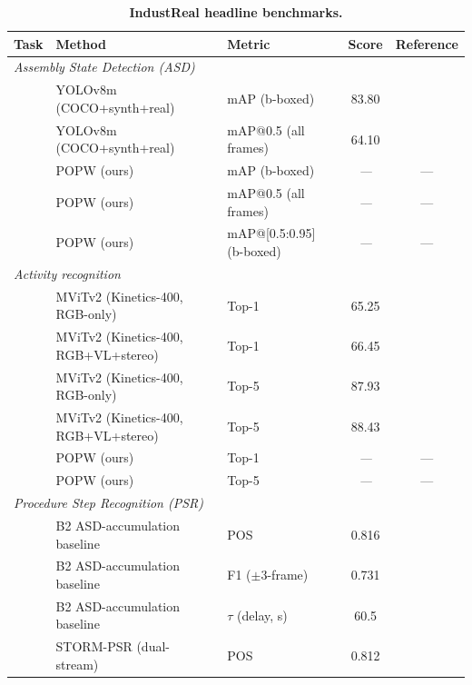 \documentclass[11pt,a4paper]{article}
\newcommand{\popw}{POPW}
\newcommand{\industreal}{IndustReal}
\newcommand{\map}{mAP}
\newcommand{\todo}{\textit{---}}
\newcommand{\popwres}{\todo}
\begin{document}
\begin{table}[!htbp]
\centering
\small
\caption{\textbf{\industreal{} headline benchmarks.}}
\label{tab:industreal-headline}
\begin{tabular}{l l l c c}
\toprule
\textbf{Task} & \textbf{Method} & \textbf{Metric} & \textbf{Score} & \textbf{Reference} \\
\midrule
\multicolumn{5}{l}{\textit{Assembly State Detection (ASD)}} \\
  & YOLOv8m (COCO+synth+real) & \map{} (b-boxed) & 83.80 & \cite{schoonbeek2024industreal} \\
  & YOLOv8m (COCO+synth+real) & \map{}@0.5 (all frames) & 64.10 & \cite{schoonbeek2024industreal} \\
  & \popw{} (ours)            & \map{} (b-boxed) & \popwres & --- \\
  & \popw{} (ours)            & \map{}@0.5 (all frames) & \popwres & --- \\
  & \popw{} (ours)            & \map{}@[0.5{:}0.95] (b-boxed) & \popwres & --- \\
\midrule
\multicolumn{5}{l}{\textit{Activity recognition}} \\
& MViTv2 (Kinetics-400, RGB-only) & Top-1   & 65.25 & \cite{schoonbeek2024industreal} \\
  & MViTv2 (Kinetics-400, RGB+VL+stereo) & Top-1   & 66.45 & \cite{schoonbeek2024industreal} \\
  & MViTv2 (Kinetics-400, RGB-only) & Top-5   & 87.93 & \cite{schoonbeek2024industreal} \\
  & MViTv2 (Kinetics-400, RGB+VL+stereo) & Top-5   & 88.43 & \cite{schoonbeek2024industreal} \\
 & \popw{} (ours)            & Top-1          & \popwres & --- \\
 & \popw{} (ours)            & Top-5          & \popwres & --- \\
\midrule
 \multicolumn{5}{l}{\textit{Procedure Step Recognition (PSR)}} \\
  & B2 ASD-accumulation baseline & POS         & 0.816 & \cite{schoonbeek2024industreal} \\
  & B2 ASD-accumulation baseline & F1 ($\pm3$-frame)         & 0.731 & \cite{schoonbeek2024industreal} \\
  & B2 ASD-accumulation baseline & ${\tau}$ (delay, s) & 60.5 & \cite{schoonbeek2024industreal} \\
  & STORM-PSR (dual-stream)~\cite{schoonbeek2025storm} & POS & 0.812 & \cite{schoonbeek2025storm} \\

\end{tabular}
\end{table}
\end{document}
